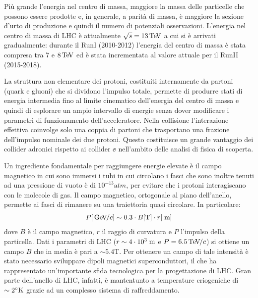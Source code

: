 Pi\`u grande l'energia nel centro di massa, maggiore la massa delle particelle che possono essere prodotte e, in generale, a parit\`a di massa, \`e maggiore la sezione d'urto di produzione e quindi il numero di potenziali osservazioni. L'energia nel centro di massa di LHC \`e attualmente $\sqrt{s}=13{\rm \, Te\kern-0.125em V}$ a cui si \`e arrivati gradualmente: durante il RunI (2010-2012) l'energia del centro di massa \`e stata compresa tra 7 e $8{\rm \, Te\kern-0.125em V}$ ed \`e stata incrementata al valore attuale per il RunII (2015-2018).  

La struttura non elementare dei protoni, costituiti internamente da partoni (quark e gluoni) che si dividono l'impulso totale, permette di produrre stati di energia intermedia fino al limite cinematico dell'energia del centro di massa e quindi di esplorare un ampio intervallo di energie senza dover modificare i parametri di funzionamento dell'acceleratore. Nella collisione l'interazione effettiva coinvolge solo una coppia di partoni che trasportano una frazione dell'impulso nominale dei due protoni. Questo costituisce un grande vantaggio dei collider adronici rispetto ai collider $\ee$ nell'ambito delle analisi di fisica di scoperta.


Un ingrediente fondamentale per raggiungere energie elevate \`e il campo magnetico in cui sono immersi i tubi in cui circolano i fasci che sono inoltre tenuti ad una pressione di vuoto è di $10^{-13}{\mathrm atm}$, per evitare che i protoni interagiscano con le molecole di gas. Il campo magnetico, ortogonale al piano dell'anello, permette ai fasci di rimanere su una traiettoria quasi circolare. In particolare:
\begin{equation}
P[{\rm \, Ge\kern-0.125em V}\kern-0.125em /c] \sim 0.3 \cdot B[{\mathrm T}] \cdot r[\rm \; m]
\end{equation}
dove $B$ è il campo magnetico, $r$ il raggio di curvatura e $P$ l'impulso della particella. Dati i parametri di LHC ($r\sim4 \cdot 10^3\rm \; m$ e $P=6.5{\rm \, Te\kern-0.125em V}\kern-0.125em /c$) si ottiene un campo $B$ che in media è pari a $\sim 5.4{\mathrm T}$. Per ottenere un campo di tale intensit\`a è stato necessario sviluppare dipoli magnetici superconduttori, il che ha rappresentato un'importante sfida tecnologica per la progettazione di LHC. Gran parte dell'anello di LHC, infatti, \`e mantentunto a temperature criogeniche di $\sim 2^\circ {\mathrm K}$ grazie ad un complesso sistema di raffreddamento.


